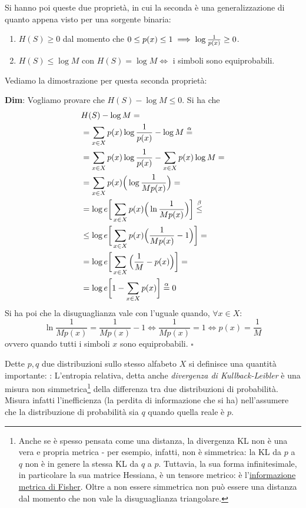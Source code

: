Si hanno poi queste due propriet\`a, in cui la seconda \`e una generalizzazione di quanto appena visto per una sorgente binaria:
\begin{enumerate}
    \item $H(S) \geq 0$ dal momento che $0 \leq p(x) \leq 1 \implies \log \frac{1}{p({x})} \geq 0$. 
    \item $H(S) \leq \log M$ con $H(S) = \log M \iff$ i simboli sono equiprobabili.
\end{enumerate}
Vediamo la dimostrazione per questa seconda propriet\`a: 
\begin{tcolorbox}
\textbf{Dim}: Vogliamo provare che $H(S) - \log M \leq 0$. Si ha che
\begin{align*}
&H(S) - \log M = \\
&= \sum_{x \in X} p(x) \log \frac{1}{p({x})} - \log M \overset{\alpha}{=} \\
&= \sum_{x \in X} p(x) \log \frac{1}{p({x})} - \sum_{x \in X} p(x) \log M = \\
&= \sum_{x \in X} p(x) \Big ( \log \frac{1}{Mp(x)} \Big ) = \\
&= \log{e} \bigg [ \sum_{x \in X} p(x) \Big ( \ln \frac{1}{Mp(x)} \Big ) \bigg ] \overset{\beta}{\leq} \\
&\leq \log{e} \bigg [ \sum_{x \in X} p(x) \Big ( \frac{1}{Mp(x)} - 1 \Big ) \bigg ] = \\
&= \log{e} \bigg [ \sum_{x \in X} \Big ( \frac{1}{M} - p(x) \Big ) \bigg ] = \\
&= \log{e} \bigg [ 1 - \sum_{x \in X} p(x) \bigg] \overset{\alpha}{=} 0 \\
\end{align*} 
Si ha poi che la disuguaglianza vale con l'uguale quando, $\forall x \in X$:
\[
\ln \frac{1}{Mp(x)} = \frac{1}{Mp(x)} -1 \iff \frac{1}{Mp(x)} = 1 \iff p(x) = \frac{1}{M}
\]
ovvero quando tutti i simboli $x$ sono equiprobabili. $\square$
\end{tcolorbox}
Dette $p,q$ due distribuzioni sullo stesso alfabeto $X$ si definisce una quantit\`a importante: 
: L'entropia relativa, detta anche \textit{divergenza di Kullback-Leibler} è una misura non simmetrica{\footnote{Anche se è spesso pensata come una distanza, la divergenza KL non è una vera e propria metrica - per esempio, infatti, non è simmetrica: la KL da $p$ a $q$ non è in genere la stessa KL da $q$ a $p$. Tuttavia, la sua forma infinitesimale, in particolare la sua matrice Hessiana, è un tensore metrico: \`e l'\href{https://it.wikipedia.org/wiki/Informazione_di_Fisher}{informazione metrica di Fisher}. Oltre a non essere simmetrica non pu\`o essere una distanza dal momento che non vale la disuguaglianza triangolare.}} della differenza tra due distribuzioni di probabilità. Misura infatti l'inefficienza (la perdita di informazione che si ha) nell'assumere che la distribuzione di probabilit\`a sia $q$ quando quella reale \`e $p$.
